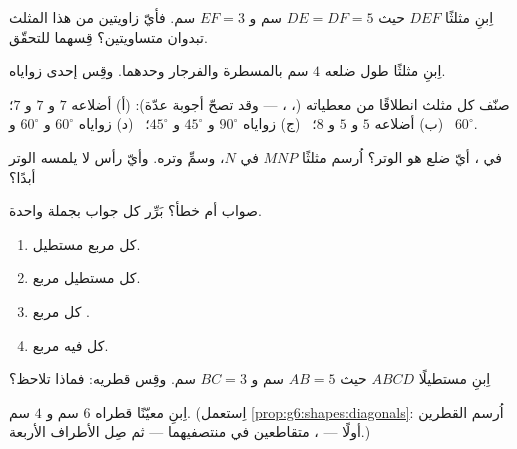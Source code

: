 \begin{exercise}[$\star$]\label{exo:g6:shapes:2}
اِبنِ مثلثًا  $DEF$ حيث $DE = DF = 5$ سم و
$EF = 3$ سم. فأيّ زاويتين من هذا المثلث تبدوان متساويتين؟ قِسهما
للتحقّق.
\end{exercise}

\begin{exercise}[$\star$]\label{exo:g6:shapes:3}
اِبنِ مثلثًا  طول ضلعه $4$ سم بالمسطرة والفرجار
وحدهما. وقِس إحدى زواياه.
\end{exercise}

\begin{exercise}[$\star$]\label{exo:g6:shapes:4}
صنّف كل مثلث انطلاقًا من معطياته (، ،
 --- وقد تصحّ أجوبة عدّة):
(أ) أضلاعه $7$ و $7$ و $7$؛ \
(ب) أضلاعه $5$ و $5$ و $8$؛ \
(ج) زواياه $90^\circ$ و $45^\circ$ و $45^\circ$؛ \
(د) زواياه $60^\circ$ و $60^\circ$ و $60^\circ$.
\end{exercise}

\begin{exercise}[$\star$]\label{exo:g6:shapes:5}
في ، أيّ ضلع هو الوتر؟ اُرسم مثلثًا
$MNP$  في $N$، وسمِّ وتره. وأيّ رأس لا
يلمسه الوتر أبدًا؟
\end{exercise}

\begin{exercise}[$\star$]\label{exo:g6:shapes:6}
صواب أم خطأ؟ بَرِّر كل جواب بجملة واحدة.
\begin{enumerate}
  \item كل مربع مستطيل.
  \item كل مستطيل مربع.
  \item كل مربع .
  \item كل  فيه  مربع.
\end{enumerate}
\end{exercise}

\begin{exercise}[$\star$]\label{exo:g6:shapes:7}
اِبنِ مستطيلًا $ABCD$ حيث $AB = 5$ سم و $BC = 3$ سم. وقِس
قطريه: فماذا تلاحظ؟
\end{exercise}

\begin{exercise}[$\star$]\label{exo:g6:shapes:8}
اِبنِ معيّنًا قطراه $6$ سم و $4$ سم. (اِستعمل
\cref{prop:g6:shapes:diagonals}: اُرسم القطرين أولًا ---
\omterm{def:g6:lines:perp}{متعامدين}، متقاطعين في منتصفيهما --- ثم صِل الأطراف
الأربعة.)
\end{exercise}

